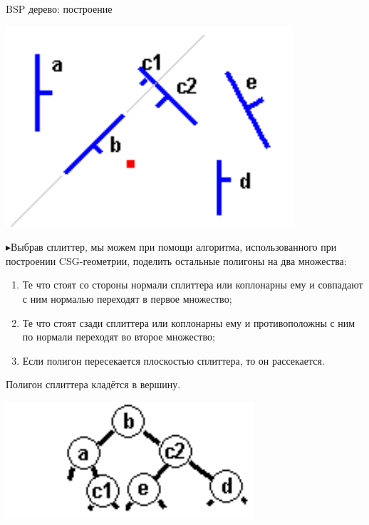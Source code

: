 \documentclass{beamer}
\newcommand{\tri}{{\color{blue!40} $\blacktriangleright$}\:}
\begin{document}
\begin{frame}{BSP дерево: построение}
\footnotesize

\begin{center}
\includegraphics[scale=0.3]{img2}
\end{center}
\tri Выбрав сплиттер, мы можем при помощи алгоритма, использованного при построении CSG-геометрии, поделить остальные полигоны на два множества:
\begin{enumerate}
    \item Те что стоят со стороны нормали сплиттера или коплонарны ему и совпадают с ним нормалью переходят в первое множество;
    \item Те что стоят сзади сплиттера или коплонарны ему и противоположны с ним по нормали переходят во второе множество;
    \item Если полигон пересекается плоскостью сплиттера, то он рассекается.
\end{enumerate}
Полигон сплиттера кладётся в вершину.
\begin{center}
\includegraphics[scale=0.4]{img3}
\end{center}

\end{frame}
\end{document}
